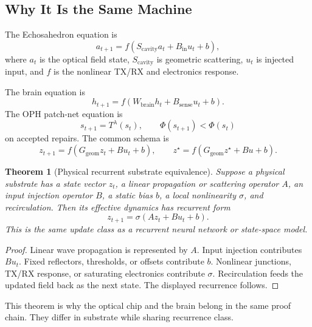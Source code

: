 \documentclass[11pt]{article}
\newtheorem{theorem}{Theorem}[section]
\theoremstyle{remark}
\theoremstyle{plain}
\begin{document}
\subsection{Why It Is the Same Machine}

The Echosahedron equation is
\[
a_{t+1}
=
f(S_{\mathrm{cavity}}a_t+B_{\mathrm{in}}u_t+b),
\]
where \(a_t\) is the optical field state, \(S_{\mathrm{cavity}}\) is geometric scattering, \(u_t\) is injected input, and \(f\) is the nonlinear TX/RX and electronics response.

The brain equation is
\[
h_{t+1}
=
f(W_{\mathrm{brain}}h_t+B_{\mathrm{sense}}u_t+b).
\]
The OPH patch-net equation is
\[
s_{t+1}=T^\lambda(s_t),
\qquad
\Phi(s_{t+1})<\Phi(s_t)
\]
on accepted repairs. The common schema is
\[
\boxed{
z_{t+1}=f(G_{\mathrm{geom}}z_t+Bu_t+b),
\qquad
z^\star=f(G_{\mathrm{geom}}z^\star+Bu+b).
}
\]

\begin{theorem}[Physical recurrent substrate equivalence]
Suppose a physical substrate has a state vector \(z_t\), a linear propagation or scattering operator \(A\), an input injection operator \(B\), a static bias \(b\), a local nonlinearity \(\sigma\), and recirculation. Then its effective dynamics has recurrent form
\[
z_{t+1}=\sigma(Az_t+Bu_t+b).
\]
This is the same update class as a recurrent neural network or state-space model.
\end{theorem}

\begin{proof}
Linear wave propagation is represented by \(A\). Input injection contributes \(Bu_t\). Fixed reflectors, thresholds, or offsets contribute \(b\). Nonlinear junctions, TX/RX response, or saturating electronics contribute \(\sigma\). Recirculation feeds the updated field back as the next state. The displayed recurrence follows.
\end{proof}

This theorem is why the optical chip and the brain belong in the same proof
chain. They differ in substrate while sharing recurrence class.
\end{document}

